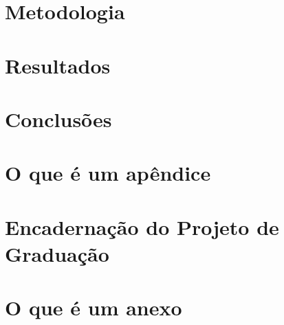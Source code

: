 \documentclass[a4paper,12pt,oneside,openany]{book}
\begin{document}
\chapter{Metodologia}
\label{metodologia}


\chapter{Resultados}
\label{resultados}


\chapter{Conclusões}
\label{conclusao}


\normalsize
\cleardoublepage
{}



   \appendix
   \chapter{O que é um apêndice}
   \label{ApendiceA}
   
   \chapter{Encadernação do Projeto de Graduação}
   \label{ApendiceB}
   
   \chapter{O que é um anexo}
   \label{ApendiceC}
      

\backmatter
\end{document}
